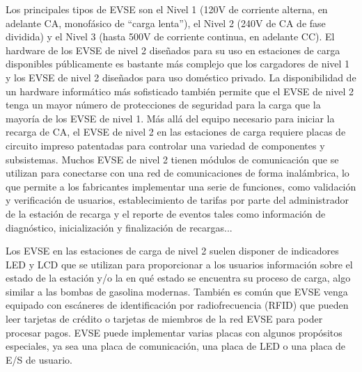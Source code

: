 \documentclass[12pt,a4paper,onecolumn,oneside]{report}
\begin{document}
Los principales tipos de EVSE son el Nivel 1 (120V de corriente alterna, en adelante CA,  monofásico de ``carga lenta”), el Nivel 2 (240V de CA de fase dividida) y el Nivel 3 (hasta 500V de corriente continua, en adelante CC). El hardware de los EVSE de nivel 2 diseñados para su uso en estaciones de carga disponibles públicamente es bastante más complejo que los cargadores de nivel 1 y los EVSE de nivel 2 diseñados para uso doméstico privado. La disponibilidad de un hardware informático más sofisticado también permite que el EVSE de nivel 2 tenga un mayor número de protecciones de seguridad para la carga que la mayoría de los EVSE de nivel 1. Más allá del equipo necesario para iniciar la recarga de CA, el EVSE de nivel 2 en las estaciones de carga requiere placas de circuito impreso patentadas para controlar una variedad de componentes y subsistemas. Muchos EVSE de nivel 2 tienen módulos de comunicación que se utilizan para conectarse con una red de comunicaciones de forma inalámbrica, lo que permite a los fabricantes implementar una serie de funciones, como validación y verificación de usuarios, establecimiento de tarifas por parte del administrador de la estación de recarga y el reporte de eventos tales como información de diagnóstico, inicialización y finalización de recargas...

Los EVSE en las estaciones de carga de nivel 2 suelen disponer de indicadores LED y LCD que se utilizan para proporcionar a los usuarios información sobre el estado de la estación y/o la en qué estado se encuentra su proceso de carga, algo similar a las bombas de gasolina modernas. También es común que EVSE venga equipado con escáneres de identificación por radiofrecuencia (RFID) que pueden leer tarjetas de crédito o tarjetas de miembros de la red EVSE para poder procesar pagos. EVSE puede implementar varias placas con algunos propósitos especiales, ya sea una placa de comunicación, una placa de LED o una placa de E/S de usuario. 
\end{document}
